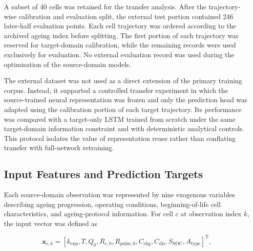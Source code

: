 \documentclass[a4paper,fleqn]{cas-sc}
\begin{document}
A subset of 40 cells was retained for the transfer analysis. After the trajectory-wise calibration and evaluation split, the external test portion contained 246 later-half evaluation points. Each cell trajectory was ordered according to the archived ageing index before splitting. The first portion of each trajectory was reserved for target-domain calibration, while the remaining records were used exclusively for evaluation. No external evaluation record was used during the optimisation of the source-domain models.

The external dataset was not used as a direct extension of the primary training corpus. Instead, it supported a controlled transfer experiment in which the source-trained neural representation was frozen and only the prediction head was adapted using the calibration portion of each target trajectory. Its performance was compared with a target-only LSTM trained from scratch under the same target-domain information constraint and with deterministic analytical controls. This protocol isolates the value of representation reuse rather than conflating transfer with full-network retraining.




\subsection{Input Features and Prediction Targets}
\label{sec:features_targets}


Each source-domain observation was represented by nine exogenous variables describing ageing progression, operating conditions, beginning-of-life cell characteristics, and ageing-protocol information. For cell $c$ at observation index $k$, the input vector was defined as

\begin{equation}
\mathbf{x}_{c,k} =
\left[
k_{\mathrm{exp}},
T,
Q_{0},
R_{e,0},
R_{\mathrm{pulse},0},
C_{\mathrm{chg}},
C_{\mathrm{dis}},
S_{\mathrm{SOC}},
A_{\mathrm{type}}
\right]^{\mathrm{T}},
\label{eq:input_vector}
\end{equation}
\end{document}
